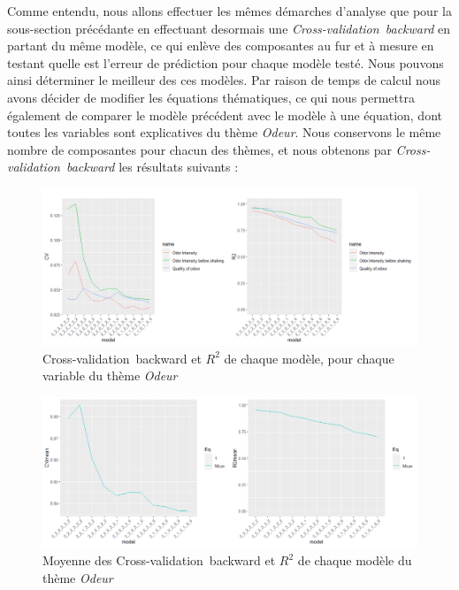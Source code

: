 \documentclass[a4paper,french,10pt]{article}
\begin{document}
\bigskip
\bigskip

Comme entendu, nous allons effectuer les mêmes démarches d'analyse que pour la sous-section précédante en effectuant desormais une \textit{Cross-validation~backward} en partant du même modèle, ce qui enlève des composantes au fur et à mesure en testant quelle est l’erreur de prédiction pour chaque modèle testé. Nous pouvons ainsi déterminer le meilleur des ces modèles. Par raison de temps de calcul nous avons décider de modifier les équations thématiques, ce qui nous permettra également de comparer le modèle précédent avec le modèle à une équation, dont toutes les variables sont explicatives du thème \textit{Odeur}. Nous conservons le même nombre de composantes pour chacun des thèmes, et nous obtenons par \textit{Cross-validation~backward} les résultats suivants : 

\begin{figure}[htp] 
	\centering
	\includegraphics[scale=0.45]{images/CV_all.png}
	\caption{Cross-validation~backward et $R^2$ de chaque modèle, pour chaque variable du thème \textit{Odeur}}
\end{figure}

\begin{figure}[htp] 
	\centering
	\includegraphics[scale=0.45]{images/CV_mean.png}
	\caption{Moyenne des Cross-validation~backward et $R^2$ de chaque modèle du thème \textit{Odeur}}
\end{figure}
\end{document}
